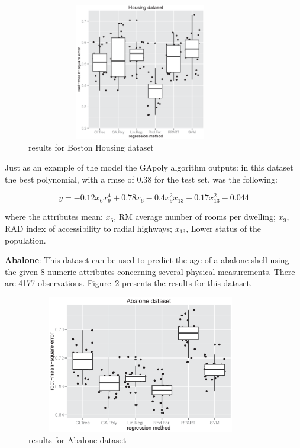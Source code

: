 \documentclass[a4paper, 12pt]{article}
\begin{document}
\begin{figure}[htb]
	\begin{center}
		\includegraphics[height=6cm,width=10cm,angle=0]
			{figures/Housing_dataset_lambda0.8_25runs.eps}
		\caption{results for Boston Housing dataset}
		\label{Housing_dataset_lambda0.8_25runs}
	\end{center}
\end{figure}

Just as an example of the model the GApoly algorithm outputs: in this dataset the best polynomial, with a rmse of 0.38 for the test set, was the following:

$$y = -0.12 x_6 x_9^4 + 0.78 x_6 - 0.4 x_9^2 x_{13} + 0.17 x_{13}^2 - 0.044$$

where the attributes mean:
$x_6$, RM average number of rooms per dwelling;
$x_9$, RAD index of accessibility to radial highways;
$x_{13}$, Lower status of the population.

\textbf{Abalone}: This dataset can be used to predict the age of a abalone shell using the given 8 numeric attributes concerning several physical measurements. There are 4177 observations. Figure~\ref{Abalone_dataset_lambda0.8_25runs} presents the results for this dataset.

\begin{figure}[htb]
	\begin{center}
		\includegraphics[height=6cm,width=10cm,angle=0]
			{figures/Abalone_dataset_lambda0.8_25runs.eps}
		\caption{results for Abalone dataset}
		\label{Abalone_dataset_lambda0.8_25runs}
	\end{center}
\end{figure}
\end{document}
